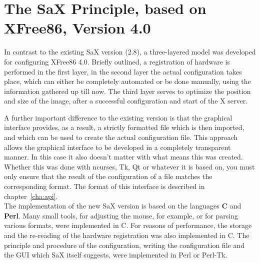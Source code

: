 \chapter{The SaX Principle, based on XFree86, Version 4.0}
\label{cha:dsp}
\minitoc
In contrast to the existing SaX version (2.8), a three-layered model was
developed for configuring XFree86 4.0. Briefly outlined, a registration of
hardware is performed in the first layer, in the second layer the actual
configuration takes place, which can either be completely automated or be
done manually, using the information gathered up till now. The third layer
serves to optimize the position and size of the image, after a successful
configuration and start of the X server. 

A further important difference to the existing version is that the graphical
interface provides, as a result, a strictly formatted file which is then 
imported, and which can be used to create the actual configuration
file. This approach allows the graphical interface to be developed in a
completely transparent manner. In this case it also doesn't matter with what
means this was created. Whether this was done with ncurses, Tk, Qt or
whatever it is based on, you must only ensure that the result of the
configuration of a file matches the corresponding format. The format of this
interface is described in chapter~\ref{cha:api}.\\

The implementation of the new SaX version is based on the languages 
\textbf{C} and \textbf{Perl}. Many small tools, for adjusting the mouse, for
example, or for parsing various formats, were implemented in C. For reasons of
performance, the storage and the re-reading of the hardware registration was
also implemented in C. The principle and procedure of the configuration,
writing the configuration file and the GUI which SaX itself suggests, were
implemented in Perl or Perl-Tk.

